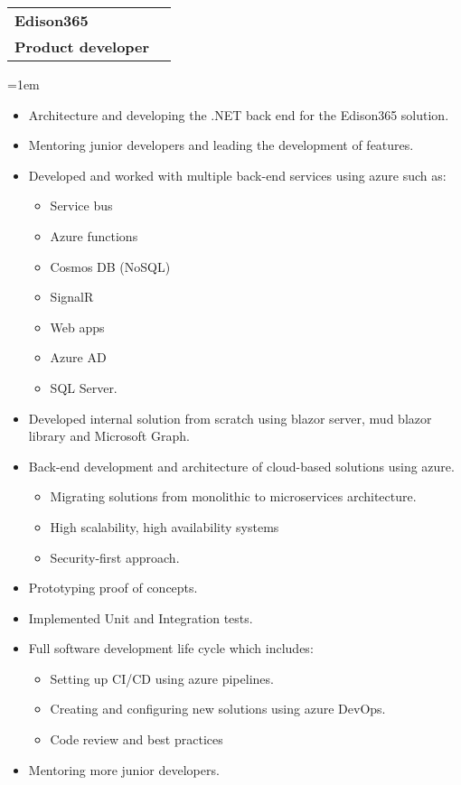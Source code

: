 \documentclass[paper=a4,fontsize=11pt]{article}
\makeatletter
\newcommand{\EducationEntry}[4]{
	\noindent
	\begin{tabularx}{\textwidth}{@{}X r@{}}
		\textbf{\large\color{primary}#1} & \textbf{\color{secondary}#2} \\
		\textbf{\color{secondary}#3} & \\
	\end{tabularx}
	\vspace{4pt}
	\noindent\hangindent=1em\hangafter=0 #4
	\vspace{8pt}
}
\makeatother
\begin{document}
{\begin{itemize}
\EducationEntry{Edison365}{\textbf{\hspace{-2cm}{May2021-August2024}}}{Product developer}{\begin{itemize}
		\itemsep-0.1em 
		\item Architecture and developing the .NET back end for the Edison365 solution.
		\item Mentoring junior developers and leading the development of features.
		\item Developed and worked with multiple back-end services using azure such as:
			\begin{itemize}
                 \item  Service bus
                  \item Azure functions
                  \item Cosmos DB (NoSQL)
                   \item SignalR
				\item Web apps 
                    \item Azure AD
                    \item SQL Server.
	  	\end{itemize}
           \item  Developed internal solution from scratch using blazor server, mud blazor library and Microsoft Graph.
    \item Back-end development and architecture of cloud-based solutions using azure.
			\begin{itemize}
                 \item Migrating solutions from monolithic to microservices architecture.
                 \item  High scalability, high availability systems
                 \item Security-first approach.
			\end{itemize}
\item Prototyping proof of concepts.
\item Implemented Unit and Integration tests.
\item  Full software development life cycle which includes:
 		\begin{itemize}
               \item Setting up CI/CD using azure pipelines.
                \item Creating and configuring new solutions using azure DevOps.  
                  \item Code review and best practices              
           \end{itemize}
\item Mentoring more junior developers.


\end{itemize}}
\end{itemize}}
\end{document}
